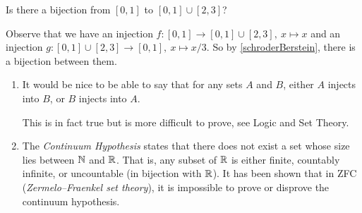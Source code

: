 \documentclass[../main.tex]{subfiles}
\begin{document}
\begin{example}
  Is there a bijection from $[0, 1]$ to $[0, 1] \cup [2, 3]$?

  Observe that we have an injection $f: [0, 1] \to [0, 1] \cup [2, 3],\ x \mapsto x$ and an injection $g: [0, 1] \cup [2, 3] \to [0, 1],\ x \mapsto x/3$.
  So by \cref{schroderBerstein}, there is a bijection between them.
\end{example}
\begin{remark}[Remarks]
  \begin{enumerate}
    \item It would be nice to be able to say that for any sets $A$ and $B$, either $A$ injects into $B$, or $B$ injects into $A$.

      This is in fact true but is more difficult to prove, see Logic and Set Theory.
    \item The \textit{Continuum Hypothesis} states that there does not exist a set whose size lies between $\mathbb{N}$ and $\mathbb{R}$.
      That is, any subset of $\mathbb{R}$ is either finite, countably infinite, or uncountable (in bijection with $\mathbb{R}$).
      It has been shown that in ZFC (\textit{Zermelo–Fraenkel set theory}), it is impossible to prove or disprove the continuum hypothesis.
  \end{enumerate}
\end{remark}
\end{document}
